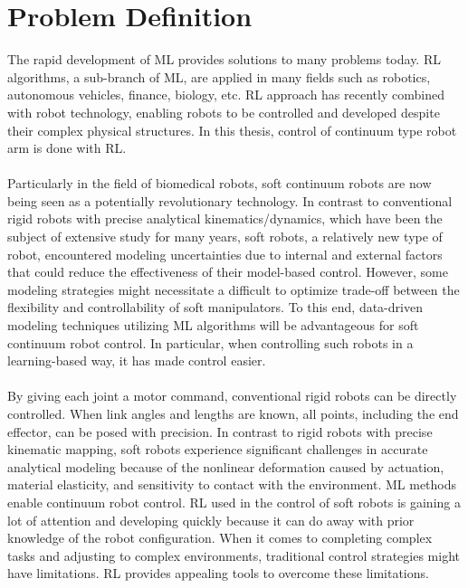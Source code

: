 \documentclass[12pt,twoside,a4]{mwbk}
\begin{document}
\section{Problem Definition}
The rapid development of ML provides solutions to many problems today. RL algorithms, a sub-branch of ML, are applied in many fields such as robotics, autonomous vehicles, finance, biology, etc. RL approach has recently combined with robot technology, enabling robots to be controlled and developed despite their complex physical structures. In this thesis, control of continuum type robot arm is done with RL. 
\\ \\
Particularly in the field of biomedical robots, soft continuum robots are now being seen as a potentially revolutionary technology. In contrast to conventional rigid robots with precise analytical kinematics/dynamics, which have been the subject of extensive study for many years, soft robots, a relatively new type of robot, encountered modeling uncertainties due to internal and external factors that could reduce the effectiveness of their model-based control. However, some modeling strategies might necessitate a difficult to optimize trade-off between the flexibility and controllability of soft manipulators. To this end, data-driven modeling techniques utilizing ML algorithms will be advantageous for soft continuum robot control. In particular, when controlling such robots in a learning-based way, it has made control easier.
\\ \\
By giving each joint a motor command, conventional rigid robots can be directly controlled. When link angles and lengths are known, all points, including the end effector, can be posed with precision. In contrast to rigid robots with precise kinematic mapping, soft robots experience significant challenges in accurate analytical modeling because of the nonlinear deformation caused by actuation, material elasticity, and sensitivity to contact with the environment. ML methods enable continuum robot control. RL used in the control of soft robots is gaining a lot of attention and developing quickly because it can do away with prior knowledge of the robot configuration. When it comes to completing complex tasks and adjusting to complex environments, traditional control strategies might have limitations. RL provides appealing tools to overcome these limitations. 
\\ \\
\end{document}
